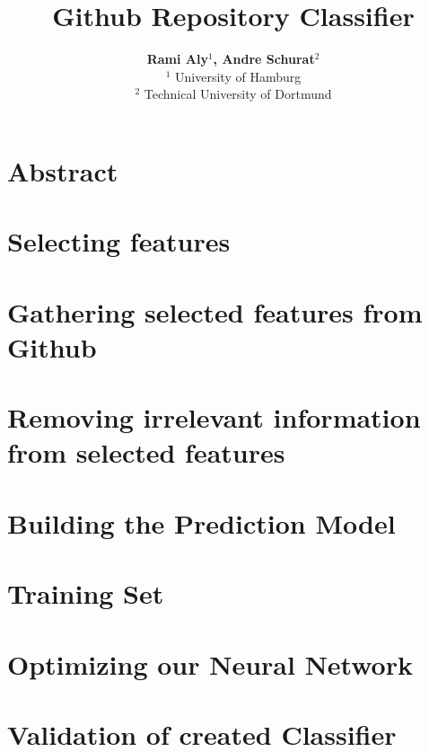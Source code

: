 \documentclass[paper=A4,pagesize=auto,13pt,headinclude=true,footinclude=true,BCOR=0mm,DIV=calc]{scrartcl}
\begin{document}
	
	\title{Github Repository Classifier}
	\author{\textbf{Rami Aly$^{1}$, Andre Schurat}$^{2}$\\
		$^{1}$ University of Hamburg\\
		$^{2}$ Technical University of Dortmund}
	\maketitle
	
	\newpage
	
	\section{Abstract}
	
	
	\newpage
	
	\tableofcontents 
	
	\newpage
	\section{Selecting features} 
	
	
	\section{Gathering selected features from Github}
	
	
	
	\section{Removing irrelevant information from selected features}

	
	
	\section{Building the Prediction Model}
	
	\section{Training Set}
	
	\section{Optimizing our Neural Network }

	
	\section{Validation of created Classifier}
	
\end{document}
